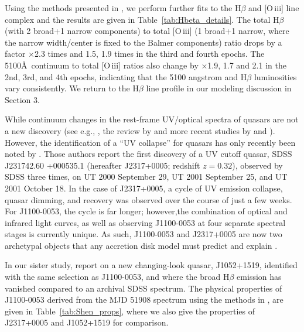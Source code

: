 \documentclass[a4paper,fleqn,usenatbib]{mnras}
\begin{document}
Using the methods presented in \citet{Jun2015a}, we perform further fits to
the H$\beta$ and [O\,{\sc iii}] line complex and the results are given
in Table~\ref{tab:Hbeta_details}.  The total H$\beta$ (with 2 broad+1
narrow components) to total [O\,{\sc iii}] (1 broad+1 narrow, where
the narrow width/center is fixed to the Balmer components) ratio 
 drops by a factor $\times$2.3 times and 1.5, 1.9 times in the third 
and fourth epochs. %
The 5100\AA\ continuum to total [O\,{\sc iii}] ratios also change 
by $\times$1.9, 1.7 and 2.1 in the 2nd, 3rd, and 4th epochs, indicating
that the 5100 angstrom and H$\beta$ luminosities vary consistently.
We return to the H$\beta$ line profile in our modeling discussion in
Section 3.

While continuum changes in the rest-frame UV/optical spectra of
quasars are not a new discovery (see e.g., \citealt{Clavel1991}, the
review by \citealt{Ulrich1997} and more recent studies by
\citealt{VandenBerk2004, Pereyra2006, MacLeod2010} and
\citealt{Guo2016b}). However, the identification of a ``UV collapse''
for quasars has only recently been noted by \cite{Guo2016}.  Those
authors report the first discovery of a UV cutoff quasar, SDSS
J231742.60 +000535.1 (hereafter J2317+0005; redshift $z = 0.32$),
observed by SDSS three times, on UT 2000 September 29, UT 2001
September 25, and UT 2001 October 18. In the case of J2317+0005, a
cycle of UV emission collapse, quasar dimming, and recovery was
observed over the course of just a few weeks. For J1100-0053, the
cycle is far longer; however,the combination of optical and infrared
light curves, as well as observing J1100-0053 at four separate
spectral stages is currently unique. As such, J1100-0053 and
J2317+0005 are now two archetypal objects that any accretion disk
model must predict and explain \citep[e.g.,][]{Lawrence2018}.

In our sister study, \citet{Stern2018} report on a new
changing-look quasar, J1052+1519, identified with the same selection
as J1100-0053, and where the broad H$\beta$ emission has vanished
compared to an archival SDSS spectrum. The physical properties of
J1100-0053 derived from the MJD 51908 spectrum using the methods in
\citet{Shen2011}, are given in Table~\ref{tab:Shen_props}, where we
also give the properties of J2317+0005 \citep{Guo2016} and J1052+1519
\citep{Stern2018} for comparison.
\end{document}
